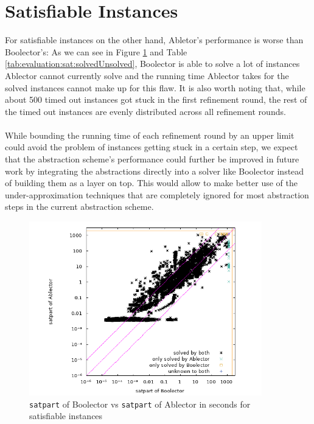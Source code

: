 
\section{Satisfiable Instances}
For satisfiable instances on the other hand, Abletor's performance is worse than Boolector's: As we can see in Figure \ref{fig:evaluation:sat:scatter} and Table \ref{tab:evaluation:sat:solvedUnsolved}, Boolector is able to solve a lot of instances Ablector cannot currently solve and the running time Ablector takes for the solved instances cannot make up for this flaw.
It is also worth noting that, while about 500 timed out instances got stuck in the first refinement round, the rest of the timed out instances are evenly distributed across all refinement rounds.
\paragraph{}
While bounding the running time of each refinement round by an upper limit could avoid the problem of instances getting stuck in a certain step, we expect that the abstraction scheme's performance could further be improved in future work by integrating the abstractions directly into a solver like Boolector instead of building them as a layer on top. This would allow to make better use of the under-approximation techniques that are completely ignored for most abstraction steps in the current abstraction scheme.

\begin{figure}[]
    \centering
        \includegraphics[width=0.9\textwidth]{plots/sat/Boolector-vs-Ablector-satpart.png}
    \caption{\texttt{satpart} of Boolector vs \texttt{satpart} of Ablector in seconds for satisfiable instances}
    \label{fig:evaluation:sat:scatter}
\end{figure}

